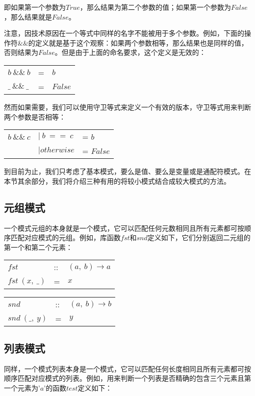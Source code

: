 即如果第一个参数为$True$，那么结果为第二个参数的值；如果第一个参数为$False$，那么结果就是$False$。

注意，因技术原因在一个等式中同样的名字不能被用于多个参数。例如，下面的操作符$\&\&$的定义就是基于这个观察：如果两个参数相等，那么结果也是同样的值，否则结果为$False$。但是由于上面的命名要求，这个定义是无效的：

\begin{tabular}[t]{lll}
$b~\&\&~b$&=&$b$\\
$\_~\&\&~\_$&=&$False$\\
\end{tabular}

然而如果需要，我们可以使用守卫等式来定义一个有效的版本，守卫等式用来判断两个参数是否相等：

\begin{tabular}[t]{lll}
$b~\&\&~c$ & $|~b~==~c$ &= $b$\\
& $|otherwise$ &= $False$\\
\end{tabular}

到目前为止，我们只考虑了基本模式，要么是值、要么是变量或是通配符模式。在本节其余部分，我们将介绍三种有用的将较小模式结合成较大模式的方法。

\subsection*{元组模式}
一个模式元组的本身就是一个模式，它可以匹配任何元数相同且所有元素都可按顺序匹配对应模式的元组。例如，库函数$fst$和$snd$定义如下，它们分别返回二元组的第一个和第二个元素：

\begin{tabular}[t]{lll}
$fst$&::&$(a,~b) \rightarrow a$\\
$fst~(x,~\_)$&=&$x$\\
\end{tabular}

\begin{tabular}[t]{lll}
$snd$&::&$(a,~b) \rightarrow b$\\
$snd~(\_,~y)$&=&$y$\\
\end{tabular}

\subsection*{列表模式}
同样，一个模式列表本身是一个模式，它可以匹配任何长度相同且所有元素都可按顺序匹配对应模式的列表。例如，用来判断一个列表是否精确的包含三个元素且第一个元素为'$a$'的函数$test$定义如下：

